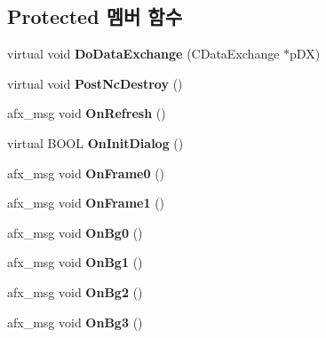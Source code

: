 \subsection*{Protected 멤버 함수}
\begin{DoxyCompactItemize}
\item 
\mbox{\label{class_map_view_aee4e07be36ab0fbfe2c268d149c40e98}} 
virtual void {\bfseries Do\+Data\+Exchange} (C\+Data\+Exchange $\ast$p\+DX)
\item 
\mbox{\label{class_map_view_a50910da172e0cd2a6e13fde5d5799906}} 
virtual void {\bfseries Post\+Nc\+Destroy} ()
\item 
\mbox{\label{class_map_view_aecebb6b2f85810fad29d3e26e125036f}} 
afx\+\_\+msg void {\bfseries On\+Refresh} ()
\item 
\mbox{\label{class_map_view_a10c4f05b5c4289dfc08c6501de3cf40c}} 
virtual B\+O\+OL {\bfseries On\+Init\+Dialog} ()
\item 
\mbox{\label{class_map_view_a40f869c5b6d3c5b93d46a0b0167cdbd8}} 
afx\+\_\+msg void {\bfseries On\+Frame0} ()
\item 
\mbox{\label{class_map_view_ad8ca5cae3a97cb68c733a993317ce695}} 
afx\+\_\+msg void {\bfseries On\+Frame1} ()
\item 
\mbox{\label{class_map_view_a63d587842197ce259cfcf9cfd29d0771}} 
afx\+\_\+msg void {\bfseries On\+Bg0} ()
\item 
\mbox{\label{class_map_view_a67a49b3a77fa0205f7729a391d45f26c}} 
afx\+\_\+msg void {\bfseries On\+Bg1} ()
\item 
\mbox{\label{class_map_view_a886ec2fa23dba5da34cdbc6f004c1bea}} 
afx\+\_\+msg void {\bfseries On\+Bg2} ()
\item 
\mbox{\label{class_map_view_a1d3dab96b11cbe494f45f4d1bc86331f}} 
afx\+\_\+msg void {\bfseries On\+Bg3} ()
\item 
\mbox{\label{class_map_view_a835d1f2f38753ace4840b69e4eaafcaf}} 

\end{DoxyCompactItemize}
